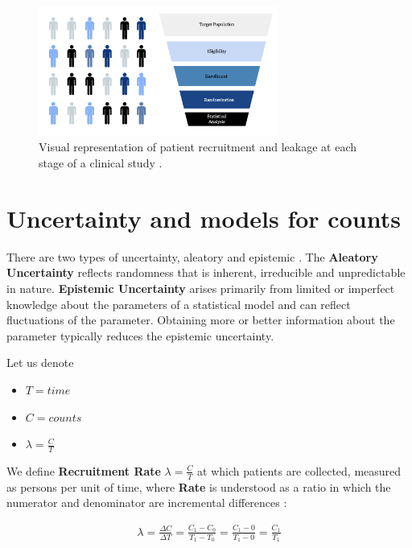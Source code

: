 \begin{figure}[h]
  \centering
  \includegraphics[width=0.7\textwidth]{fig_2_1_b.png}
  \caption{Visual representation of patient recruitment and leakage at each stage of a clinical study \citep{piantadosi2022principles, whelan2018high, bogin2022lasagna}.}
  \label{fig:2_1_b}
\end{figure}

\section{Uncertainty and models for counts}

There are two types of uncertainty, aleatory and epistemic \citep{ohagan2006}. The \textbf{Aleatory Uncertainty} reflects randomness that is inherent, irreducible and unpredictable in nature. \textbf{Epistemic Uncertainty} arises primarily from limited or imperfect knowledge about the parameters of a statistical model and can reflect fluctuations of the parameter. Obtaining more or better information about the parameter typically reduces the epistemic uncertainty. 


Let us denote

\begin{itemize}
\item $T=time$
\item $C=counts$
\item $\lambda=\frac{C}{T}$
\end{itemize}

We define \textbf{Recruitment Rate} $\lambda=\frac{C}{T}$ at which patients are collected, measured as persons per unit of time, where \textbf{Rate} is understood as a ratio in which the numerator and denominator are incremental differences \citep{piantadosi2024clinical}:

\begin{align*}
\lambda = \frac{\Delta C}{\Delta T} = \frac{C_1 - C_0}{T_1 - T_0} = \frac{C_1 - 0}{T_1 - 0} = \frac{C_1}{T_1}
\end{align*}


